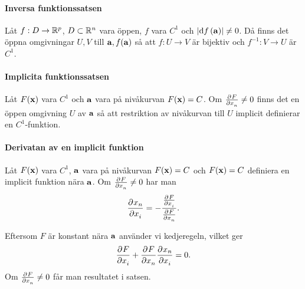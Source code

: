 \proof

\paragraph{Inversa funktionssatsen}
Låt $f: D\to\mathbb{R}^p$, $D\subset\mathbb{R}^n$ vara öppen, $f$ vara $C^1$ och $\abs{\dd{f} (\vect{a})}\neq 0$. Då finns det öppna omgivningar $U, V$ till $\vect{a}, f(\vect{a})$ så att $f:U\to V$ är bijektiv och $f^{-1}: V\to U$ är $C^1$.

\proof

\paragraph{Implicita funktionssatsen}
Låt $F(\vect{x})$ vara $C^1$ och $\vect{a}$ vara på nivåkurvan $F(\vect{x}) = C$. Om $\pdeval{F}{x_n}{\vect{a}}\neq 0$ finns det en öppen omgivning $U$ av $\vect{a}$ så att restriktion av nivåkurvan till $U$ implicit definierar en $C^1$-funktion.

\proof

\paragraph{Derivatan av en implicit funktion}
Låt $F(\vect{x})$ vara $C^1$, $\vect{a}$ vara på nivåkurvan $F(\vect{x}) = C$ och $F(\vect{x}) = C$ definiera en implicit funktion nära $\vect{a}$. Om $\pdeval{F}{x_n}{\vect{a}}\neq 0$ har man
\begin{align*}
	\pdeval{x_n}{x_i}{\vect{a}'} = -\frac{\pdeval{F}{x_i}{\vect{a}}}{\pdeval{F}{x_n}{\vect{a}}}.
\end{align*}

\proof
Eftersom $F$ är konstant nära $\vect{a}$ använder vi kedjeregeln, vilket ger
\begin{align*}
	\pdeval{F}{x_i}{\vect{a}} + \pdeval{F}{x_n}{\vect{a}}\pdeval{x_n}{x_i}{\vect{a}'} = 0.
\end{align*}
Om $\pdeval{F}{x_n}{\vect{a}}\neq 0$ får man resultatet i satsen.
